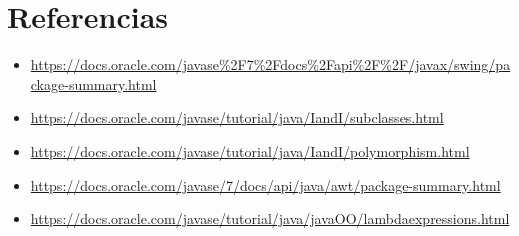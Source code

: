 \documentclass{article}
\begin{document}

\section{Referencias}
\begin{itemize}			
    \item \url{https://docs.oracle.com/javase%2F7%2Fdocs%2Fapi%2F%2F/javax/swing/package-summary.html}
    \item \url{https://docs.oracle.com/javase/tutorial/java/IandI/subclasses.html}
    \item \url{https://docs.oracle.com/javase/tutorial/java/IandI/polymorphism.html}
    \item \url{https://docs.oracle.com/javase/7/docs/api/java/awt/package-summary.html}
    \item \url{https://docs.oracle.com/javase/tutorial/java/javaOO/lambdaexpressions.html}
    
\end{itemize}	
	
%
%
%
\end{document}

